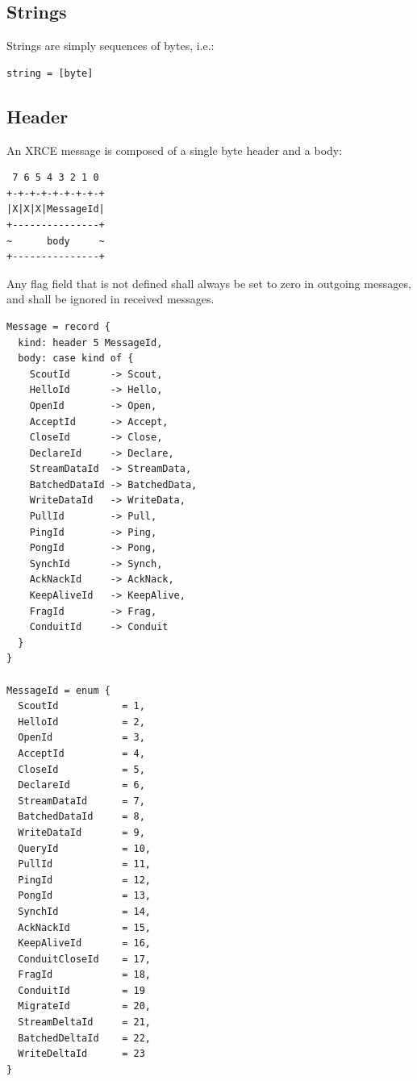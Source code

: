 \documentclass[a4paper,oneside,article]{memoir}
\begin{document}
\subsection{Strings}

Strings are simply sequences of bytes, i.e.:
\begin{verbatim}
string = [byte]
\end{verbatim}

\subsection{Header}

An XRCE message is composed of a single byte header and a body:
\begin{verbatim}
 7 6 5 4 3 2 1 0
+-+-+-+-+-+-+-+-+
|X|X|X|MessageId|
+---------------+
~      body     ~
+---------------+
\end{verbatim}

Any flag field that is not defined shall always be set to zero in outgoing messages, and shall be
ignored in received messages.
\begin{verbatim}
Message = record {
  kind: header 5 MessageId,
  body: case kind of {
    ScoutId       -> Scout,
    HelloId       -> Hello,
    OpenId        -> Open,
    AcceptId      -> Accept,
    CloseId       -> Close,
    DeclareId     -> Declare,
    StreamDataId  -> StreamData,
    BatchedDataId -> BatchedData,
    WriteDataId   -> WriteData,
    PullId        -> Pull,
    PingId        -> Ping,
    PongId        -> Pong,
    SynchId       -> Synch,
    AckNackId     -> AckNack,
    KeepAliveId   -> KeepAlive,
    FragId        -> Frag,
    ConduitId     -> Conduit
  }
}

MessageId = enum {
  ScoutId           = 1,
  HelloId           = 2,
  OpenId            = 3,
  AcceptId          = 4,
  CloseId           = 5,
  DeclareId         = 6,
  StreamDataId      = 7,
  BatchedDataId     = 8,
  WriteDataId       = 9,
  QueryId           = 10,
  PullId            = 11,
  PingId            = 12,
  PongId            = 13,
  SynchId           = 14,
  AckNackId         = 15,
  KeepAliveId       = 16,
  ConduitCloseId    = 17,
  FragId            = 18,
  ConduitId         = 19
  MigrateId         = 20,
  StreamDeltaId     = 21,
  BatchedDeltaId    = 22,
  WriteDeltaId      = 23
}
\end{verbatim}
\end{document}
